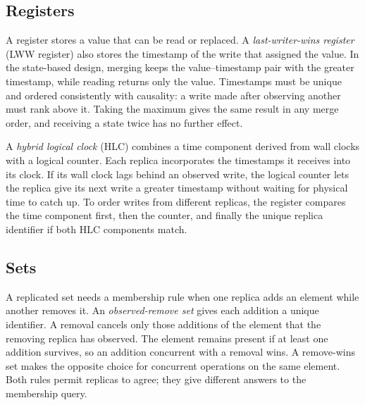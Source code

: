 \begin{illustration}[htbp]
	\centering
	\caption{The same two additions under state-based and operation-based replication}
	\label{fig:replication-models}
	
\end{illustration}
\FloatBarrier

\newpage
\subsection{Registers}

A register stores a value that can be read or replaced.
A \emph{last-writer-wins register} (LWW register) also stores the timestamp of the write that assigned the value.
In the state-based design, merging keeps the value--timestamp pair with the greater timestamp, while reading returns only the value.
Timestamps must be unique and ordered consistently with causality: a write made after observing another must rank above it.
Taking the maximum gives the same result in any merge order, and receiving a state twice has no further effect.
\parencite[Section~3.2.1]{comprehensive-study-crdts}

A \emph{hybrid logical clock} (HLC) combines a time component derived from wall clocks with a logical counter.
Each replica incorporates the timestamps it receives into its clock.
If its wall clock lags behind an observed write, the logical counter lets the replica give its next write a greater timestamp without waiting for physical time to catch up.
\parencite[Section~3.3]{logical-physical-clocks}
To order writes from different replicas, the register compares the time component first, then the counter, and finally the unique replica identifier if both HLC components match.

\subsection{Sets}

A replicated set needs a membership rule when one replica adds an element while another removes it.
An \emph{observed-remove set} gives each addition a unique identifier.
A removal cancels only those additions of the element that the removing replica has observed.
The element remains present if at least one addition survives, so an addition concurrent with a removal wins.
A remove-wins set makes the opposite choice for concurrent operations on the same element.
Both rules permit replicas to agree; they give different answers to the membership query.
\parencites[Section~3.3.5]{comprehensive-study-crdts}[3--5]{crdt-overview}

